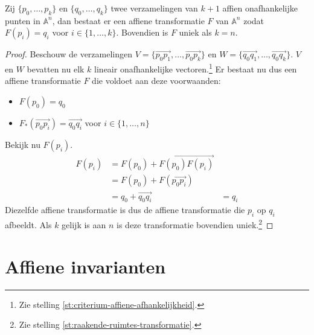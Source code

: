 \documentclass[main.tex]{subfiles}
\begin{document}
\begin{gev}
  Zij $\{p_{0},\dotsc,p_{k}\}$ en $\{q_{0},\dotsc,q_{k}\}$ twee verzamelingen van $k+1$ affien onafhankelijke punten in $\mathbb{A}^{n}$, dan bestaat er een affiene transformatie $F$ van $\mathbb{A}^{n}$ zodat $F(p_{i}) = q_{i}$ voor $i \in \{ 1,\dotsc,k \}$. Bovendien is $F$ uniek als $k=n$.

  \begin{proof}
    Beschouw de verzamelingen $V = \{\overrightarrow{p_{0}p_{1}},\dotsc,\overrightarrow{p_{0}p_{k}}\}$ en $W = \{\overrightarrow{q_{0}q_{1}},\dotsc,\overrightarrow{q_{0}q_{k}}\}$.
    $V$ en $W$ bevatten nu elk $k$ lineair onafhankelijke vectoren.\footnote{Zie stelling \ref{st:criterium-affiene-afhankelijkheid}.}
    Er bestaat nu dus een affiene transformatie $F$ die voldoet aan deze voorwaanden:
    \begin{itemize}
    \item $F(p_{0}) = q_{0}$
    \item $F_{*}(\overrightarrow{p_{0}p_{i}}) = \overrightarrow{q_{0}q_{i}}$ voor $i \in \{ 1,\dotsc,n \}$
    \end{itemize}
    Bekijk nu $F(p_{i})$.
    \[
    \begin{array}{rll}
      F(p_{i}) &= F(p_{0}) + \overrightarrow{F(p_{0})F(p_{i})} &\\
               &= F(p_{0}) + F(\overrightarrow{p_{0}p_{i}}) &\\
               &= q_{0} + \overrightarrow{q_{0}q_{i}} &= q_{i}
    \end{array} 
    \]
    Diezelfde affiene transformatie is dus de affiene transformatie die $p_{i}$ op $q_{i}$ afbeeldt.
    Als $k$ gelijk is aan $n$ is deze transformatie bovendien uniek.\footnote{Zie stelling \ref{st:raakende-ruimtes-transformatie}.}
   \end{proof}
\end{gev}


\section{Affiene invarianten}
\label{sec:affiene-invarianten}
\end{document}
